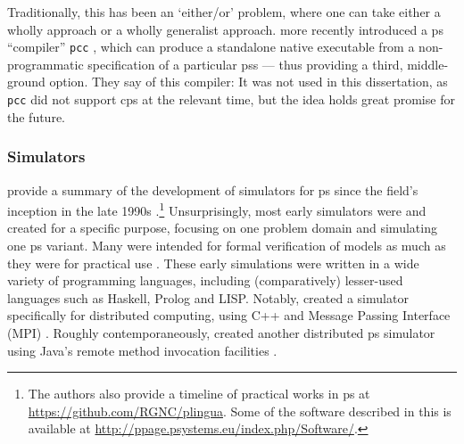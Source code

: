 Traditionally, this has been an `either/or' problem, where one can take either a wholly \adhoc{} approach or a wholly generalist approach.  \citeauthor{Perez-Hurtado2019} more recently introduced a \gls{ps} ``compiler'' \texttt{pcc} \cite{Perez-Hurtado2019}, which can produce a standalone native executable from a non-programmatic specification of a particular \glspl{ps} --- thus providing a third, middle-ground option.  They say of this compiler:   It was not used in this dissertation, as \texttt{pcc} did not support \gls{cps} at the relevant time, but the idea holds great promise for the future.


\subsubsection{\label{sec:back:simulators} Simulators}

\citeauthor{Valencia-Cabrera2019} provide a summary of the development of simulators for \Gls{ps} since the field's inception in the late 1990s \cite{Valencia-Cabrera2019}.\footnote{The authors also provide a timeline of practical works in \gls{ps} at \url{https://github.com/RGNC/plingua}.  Some of the software described in this  is available at \url{http://ppage.psystems.eu/index.php/Software/}.}  Unsurprisingly, most early simulators were \adhoc{} and created for a specific purpose, focusing on one problem domain and simulating one \gls{ps} variant.  Many were intended for formal verification of models as much as they were for practical use \cite{Gutierrez-Naranjo2007}.  These early simulations were written in a wide variety of programming languages, including (comparatively) lesser-used languages such as Haskell, Prolog and LISP.  Notably, \citeauthor{Ciobanu2004} created a simulator specifically for distributed computing, using C++ and Message Passing Interface (MPI) \cite{Ciobanu2004}.  Roughly contemporaneously, \citeauthor{Syropoulos2004} created another distributed \gls{ps} simulator using Java's remote method invocation facilities \cite{Syropoulos2004}.

